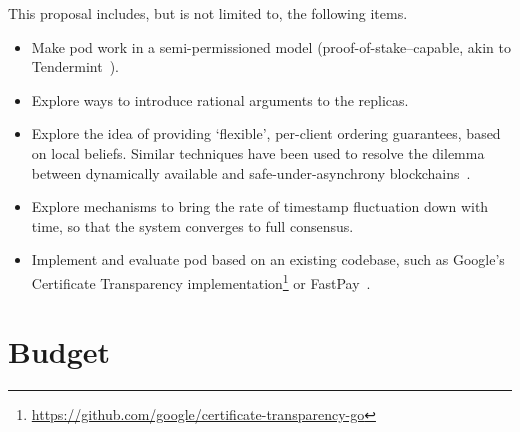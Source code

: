 This proposal includes, but is not limited to, the following items.
\begin{itemize}[left=0pt,itemindent=0pt]
    \item Make pod work in a semi-permissioned model (proof-of-stake–capable, akin to Tendermint~\cite{DBLP:journals/corr/abs-1807-04938}).
    \item Explore ways to introduce rational arguments to the replicas.
    \item Explore the idea of providing `flexible', per-client ordering guarantees, based on local beliefs. Similar techniques have been used to resolve the dilemma between dynamically available and safe-under-asynchrony blockchains~\cite{DBLP:conf/sp/NeuTT21}.
    \item Explore mechanisms to bring the rate of timestamp fluctuation down with time,  so that the system converges to full consensus.
    \item Implement and evaluate pod based on an existing codebase, such as Google's Certificate Transparency implementation\footnote{\url{https://github.com/google/certificate-transparency-go}} or FastPay~\cite{DBLP:conf/aft/BaudetDS20}.
\end{itemize}


\section{Budget}
